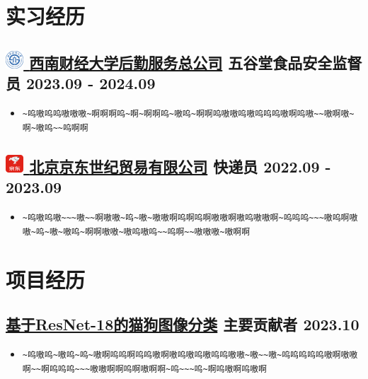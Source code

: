 \documentclass{resume}
\begin{document}
\section[实习经历]{ \textbf{\color{mainColor}实习经历}}

\subsection[西南财经大学后勤服务总公司]{\href{https://houqin.swufe.edu.cn/}{\includegraphics[align=c, height=1.2em]{img/swufe-logo.pdf} \textbf{西南财经大学后勤服务总公司}} \quad 五谷堂食品安全监督员 \hfill {\small 2023.09 - 2024.09}}
\begin{itemize}
    \item \lstinline|~呜嗷呜呜嗷嗷嗷~啊啊啊呜~啊~啊啊呜~嗷呜~啊啊呜嗷嗷呜嗷呜呜呜嗷啊呜嗷~~嗷啊嗷~啊~嗷呜~~呜啊啊|
\end{itemize}

\subsection[北京京东世纪贸易有限公司]{\href{https://zhaopin.jd.com/}{\includegraphics[align=c, height=1.2em]{img/京东.pdf} \textbf{北京京东世纪贸易有限公司}} \quad 快递员 \hfill {\small 2022.09 - 2023.09}}
\begin{itemize}
    \item \lstinline|~呜嗷呜嗷~~~嗷~~啊嗷嗷~呜~嗷~嗷嗷啊呜啊呜啊嗷嗷啊嗷呜嗷嗷啊~呜呜呜~~~嗷呜啊嗷嗷~呜~嗷~嗷呜~啊啊嗷嗷~嗷呜嗷呜~~呜啊~~嗷嗷嗷~嗷啊啊|
\end{itemize}
\section[项目经历]{ \textbf{\color{mainColor}项目经历}}

\subsection[基于ResNet-18的猫狗图像分类]{\href{https://www.kaggle.com/code/marquis03/cats-and-dogs-classification-using-resnet-18}{\textbf{基于ResNet-18的猫狗图像分类}} \quad 主要贡献者 \hfill {\small 2023.10}}
\begin{itemize}
    \item \lstinline|~呜嗷呜~嗷呜~呜~嗷啊呜呜啊呜呜嗷啊嗷呜嗷呜嗷呜呜嗷嗷~嗷~~嗷~呜呜呜呜呜嗷啊嗷嗷啊~~啊呜呜呜~~~嗷嗷啊啊呜啊嗷啊啊~呜~~~呜~啊呜嗷啊呜嗷啊|
\end{itemize}
\end{document}
